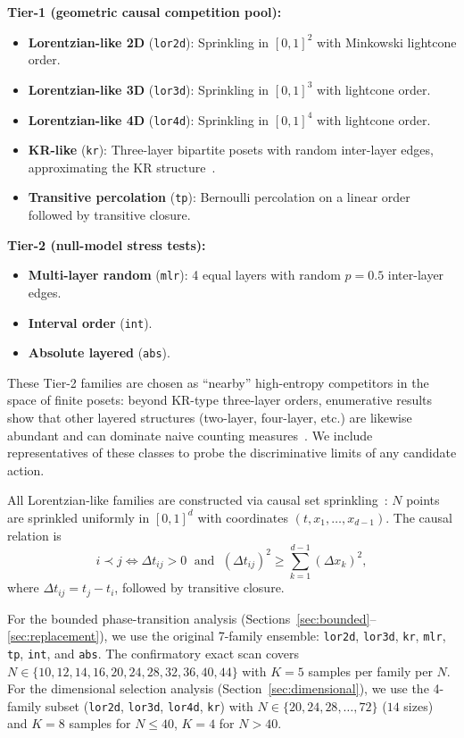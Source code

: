 \documentclass[12pt,a4paper]{article}
\begin{document}
\medskip
\noindent\textbf{Tier-1 (geometric causal competition pool):}
\begin{itemize}[nosep]
\item \textbf{Lorentzian-like 2D} (\texttt{lor2d}): Sprinkling in $[0,1]^2$
with Minkowski lightcone order.
\item \textbf{Lorentzian-like 3D} (\texttt{lor3d}): Sprinkling in $[0,1]^3$
with lightcone order.
\item \textbf{Lorentzian-like 4D} (\texttt{lor4d}): Sprinkling in $[0,1]^4$
with lightcone order.
\item \textbf{KR-like} (\texttt{kr}): Three-layer bipartite posets with random
inter-layer edges, approximating the KR structure~\cite{kleitman1975}.
\item \textbf{Transitive percolation} (\texttt{tp}): Bernoulli percolation on a
linear order followed by transitive closure.
\end{itemize}

\noindent\textbf{Tier-2 (null-model stress tests):}
\begin{itemize}[nosep]
\item \textbf{Multi-layer random} (\texttt{mlr}): 4 equal layers with random
$p = 0.5$ inter-layer edges.
\item \textbf{Interval order} (\texttt{int}).
\item \textbf{Absolute layered} (\texttt{abs}).
\end{itemize}

These Tier-2 families are chosen as ``nearby'' high-entropy competitors in the
space of finite posets: beyond KR-type three-layer orders, enumerative results
show that other layered structures (two-layer, four-layer, etc.) are likewise
abundant and can dominate naive counting measures~\cite{promel2001}. We include
representatives of these classes to probe the discriminative limits of any
candidate action.

All Lorentzian-like families are constructed via causal set
sprinkling~\cite{bombelli1987}: $N$ points are sprinkled uniformly in $[0,1]^d$
with coordinates $(t, x_1, \ldots, x_{d-1})$. The causal relation is
\begin{equation}
    i \prec j \iff \Delta t_{ij} > 0 \;\text{ and }\;
    (\Delta t_{ij})^2 \geq \sum_{k=1}^{d-1} (\Delta x_k)^2,
    \label{eq:causal}
\end{equation}
where $\Delta t_{ij} = t_j - t_i$, followed by transitive closure.

For the bounded phase-transition analysis
(Sections~\ref{sec:bounded}--\ref{sec:replacement}), we use the original
7-family ensemble: \texttt{lor2d}, \texttt{lor3d}, \texttt{kr},
\texttt{mlr}, \texttt{tp}, \texttt{int}, and \texttt{abs}. The confirmatory
exact scan covers $N \in \{10, 12, 14, 16, 20, 24, 28, 32, 36, 40, 44\}$ with
$K = 5$ samples per family per $N$. For the dimensional selection analysis
(Section~\ref{sec:dimensional}), we use the 4-family subset (\texttt{lor2d},
\texttt{lor3d}, \texttt{lor4d}, \texttt{kr}) with
$N \in \{20, 24, 28, \ldots, 72\}$ ($14$ sizes) and $K = 8$ samples for
$N \leq 40$, $K = 4$ for $N > 40$.
\end{document}

